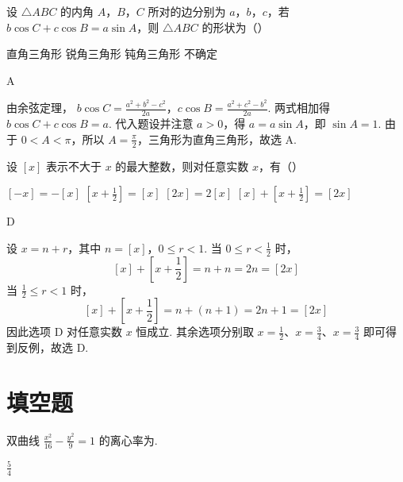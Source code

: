 \begin{problem}
设 \(\triangle ABC\) 的内角 \(A\)，\(B\)，\(C\) 所对的边分别为 \(a\)，\(b\)，\(c\)，若 \(b \cos C + c \cos B = a \sin A\)，则 \(\triangle ABC\) 的形状为（\quad）

\choices
    {直角三角形}
    {锐角三角形}
    {钝角三角形}
    {不确定}
\end{problem}

\begin{answer}
A
\end{answer}

\begin{solution}
由余弦定理，
\(b\cos C=\frac{a^2+b^2-c^2}{2a}\)，\(c\cos B=\frac{a^2+c^2-b^2}{2a}\).
两式相加得 \(b\cos C+c\cos B=a\). 代入题设并注意 \(a>0\)，得 \(a=a\sin A\)，即 \(\sin A=1\). 由于 \(0<A<\pi\)，所以 \(A=\frac{\pi}{2}\)，三角形为直角三角形，故选 A.
\end{solution}

\begin{problem}
设 \([x]\) 表示不大于 \(x\) 的最大整数，则对任意实数 \(x\)，有（\quad）

\choices
    {\([-x] = -[x]\)}
    {\(\left[x + \frac{1}{2}\right] = [x]\)}
    {\([2x] = 2[x]\)}
    {\([x] + \left[x + \frac{1}{2}\right] = [2x]\)}
\end{problem}

\begin{answer}
D
\end{answer}

\begin{solution}
设 \(x=n+r\)，其中 \(n=[x]\)，\(0\leqslant r<1\). 当 \(0\leqslant r<\frac12\) 时，
\[
[x]+\left[x+\frac12\right]=n+n=2n=[2x]
\]
当 \(\frac12\leqslant r<1\) 时，
\[
[x]+\left[x+\frac12\right]=n+(n+1)=2n+1=[2x]
\]
因此选项 D 对任意实数 \(x\) 恒成立. 其余选项分别取 \(x=\frac12\)、\(x=\frac34\)、\(x=\frac34\) 即可得到反例，故选 D.
\end{solution}

\section{填空题}

\begin{problem}
双曲线 \( \frac{x^{2}}{16}-\frac{y^{2}}{9}=1 \) 的离心率为\fillinblank{}.
\end{problem}

\begin{answer}
\(\frac{5}{4}\)
\end{answer}

